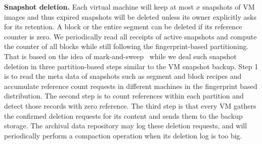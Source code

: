 {\bf Snapshot deletion.} Each virtual machine will keep at most $x$ snapshots of VM images and thus
expired snapshots will be deleted unless its owner explicitly asks for its retention. 
A block or the entire segment can be deleted if its reference counter is zero.
We periodically read all receipts of active 
snapshots and compute the counter of all blocks while still following the fingerprint-based partitioning.
That is based on the idea of mark-and-sweep~\cite{MarkSweep} while 
we deal such snapshot deletion in three partition-based steps similar to the VM snapshot backup.
Step 1 is to read  the meta data of snapshots such as segment and block
recipes and  accumulate  reference count requests in different machines  in the fingerprint based distribution.
The second step  is to count references within each partition and detect those records with zero 
reference. The third step is that every VM gathers the confirmed deletion requests for its content and sends them
to the backup storage.
The archival data repository may log these deletion requests,  and will periodically perform a compaction operation when 
its deletion log is too big. 





